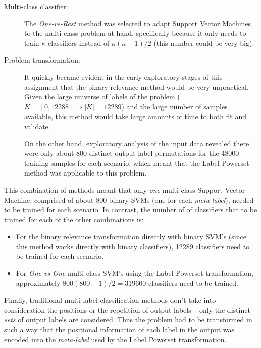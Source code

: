 \documentclass{kthreport}
\theoremstyle{definition}
\begin{document}
\begin{description}
    \item[Multi-class classifier:] The \emph{One-vs-Rest} method was selected to adapt Support Vector Machines to the multi-class problem at hand, specifically because it only needs to train $\kappa$ classifiers instead of $\kappa(\kappa-1)/2$ (this number could be very big).
    \item[Problem transformation:] It quickly became evident in the early exploratory stages of this assignment that the binary relevance method would be very unpractical. Given the large universe of labels of the problem ($ K = [0, \num{12288}] \Rightarrow |K| = \num{12289}$) and the large number of samples available, this method would take large amounts of time to both fit and validate.
    
    On the other hand, exploratory analysis of the input data revealed there were only about \num{800} distinct output label permutations for the \num{48000} training samples for each scenario, which meant that the Label Powerset method was applicable to this problem. 
\end{description}

This combination of methods meant that only \emph{one} multi-class Support Vector Machine, comprised of about \num{800} binary SVMs (one for each \emph{meta-label}), needed to be trained for each scenario. In contrast, the number of of classifiers that to be trained for each of the other combinations is:

\begin{itemize}
    \item For the binary relevance transformation directly with binary SVM's (since this method works directly with binary classifiers), \num{12289} classifiers need to be trained for each scenario.
    \item For \emph{One-vs-One} multi-class SVM's using the Label Powerset transformation, approximately $800(800-1)/2 = \num{319600}$ classifiers need to be trained. 
\end{itemize}

Finally, traditional multi-label classification methods don't take into consideration the positions or the repetition of output labels -- only the distinct \emph{sets} of output labels are considered. Thus the problem had to be transformed in such a way that the positional information of each label in the output was encoded into the \emph{meta-label} used by the Label Powerset transformation.
\end{document}
